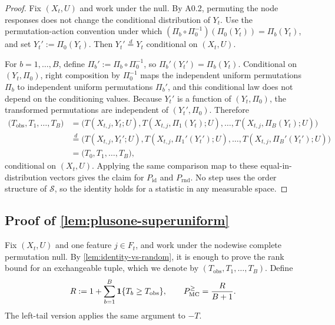 \begin{proof}
Fix $(X_t,U)$ and work under the null. By A0.2, permuting the node responses
does not change the conditional distribution of $Y_t$. Use the
permutation-action convention under which
$(\Pi_b \circ \Pi_0^{-1})(\Pi_0(Y_t)) = \Pi_b(Y_t)$, and set
$Y_t' := \Pi_0(Y_t)$. Then $Y_t' \stackrel{d}{=} Y_t$ conditional on $(X_t,U)$.

For $b=1,\dots,B$, define $\Pi_b' := \Pi_b \circ \Pi_0^{-1}$, so
$\Pi_b'(Y_t') = \Pi_b(Y_t)$. Conditional on $(Y_t,\Pi_0)$, right composition by
$\Pi_0^{-1}$ maps the independent uniform permutations $\Pi_b$ to independent
uniform permutations $\Pi_b'$, and this conditional law does not depend on the
conditioning values. Because $Y_t'$ is a function of $(Y_t,\Pi_0)$, the
transformed permutations are independent of $(Y_t',\Pi_0)$. Therefore
%
\begin{equation}
  \begin{aligned}
    \big(T_{\mathrm{obs}}, T_1,\dots,T_B\big)
    &= \big(T(X_{t,j},Y_t;U), T(X_{t,j},\Pi_1(Y_t);U),\dots,T(X_{t,j},\Pi_B(Y_t);U)\big) \\
    &\stackrel{d}{=} \big(T(X_{t,j},Y_t';U), T(X_{t,j},\Pi_1'(Y_t');U),\dots,T(X_{t,j},\Pi_B'(Y_t');U)\big) \\
    &= \big(T_0, T_1,\dots,T_B\big),
  \end{aligned}
\end{equation}
%
conditional on $(X_t,U)$. Applying the same comparison map to these
equal-in-distribution vectors gives the claim for $P_{\mathrm{id}}$ and
$P_{\mathrm{rnd}}$. No step uses the order structure of $\mathcal{S}$, so the
identity holds for a statistic in any measurable space.
\end{proof}

\subsection{Proof of \texorpdfstring{\cref{lem:plusone-superuniform}}{Lemma 1}}
\label{app:proof-plusone}

Fix $(X_t,U)$ and one feature $j \in F_t$, and work under the nodewise complete
permutation null. By \cref{lem:identity-vs-random}, it is enough to prove the
rank bound for an exchangeable tuple, which we denote by
$(T_{\mathrm{obs}},T_1,\dots,T_B)$. Define
%
\begin{equation}
  R := 1 + \sum_{b=1}^B \mathbf{1}\{T_b \ge T_{\mathrm{obs}}\},
  \qquad
  P_{\mathrm{MC}}^{\ge} = \frac{R}{B+1}.
\end{equation}
%
The left-tail version applies the same argument to $-T$.

